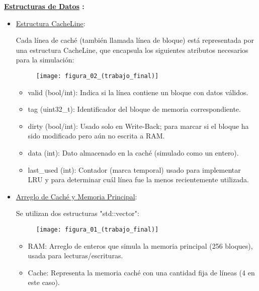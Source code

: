 \documentclass{article}
\begin{document}
\textbf{ \underline{Estructuras de Datos} :}

\quad

\begin{itemize}
    \item {\underline{Estructura CacheLine}:}

    \quad

    {Cada línea de caché (también llamada línea de bloque) está representada por una estructura CacheLine, que encapsula los siguientes atributos necesarios para la simulación:}

    \begin{figure}[h]
        \centering
        \texttt{[image: figura\_02\_(trabajo\_final)]}
        \label{fig:img1}
    \end{figure}
    
    
        \begin{itemize}
            \item valid (bool/int): Indica si la línea contiene un bloque con datos válidos.
            \item tag (uint32\_t): Identificador del bloque de memoria correspondiente.
            \item dirty (bool/int): Usado solo en Write-Back; para marcar si el bloque ha sido modificado pero aún no escrita a RAM.
            \item data (int): Dato almacenado en la caché (simulado como un entero).
            \item last\_used (int): Contador (marca temporal) usado para implementar LRU y para determinar cuál línea fue la menos recientemente utilizada.

        \end{itemize}
    
    \item {\underline{Arreglo de Caché y Memoria Principal}:}

    \quad

    {Se utilizan dos estructuras "std::vector":}

    \begin{figure}[h]
        \centering
        \texttt{[image: figura\_01\_(trabajo\_final)]}
        \label{fig:img1}
    \end{figure}

    \quad
    \newpage

    \begin{itemize}
        \item RAM: Arreglo de enteros que simula la memoria principal (256 bloques), usada para lecturas/escrituras.
        \item Cache: Representa la memoria caché con una cantidad fija de líneas (4 en este caso).


\end{itemize}
\end{itemize}
\end{document}

